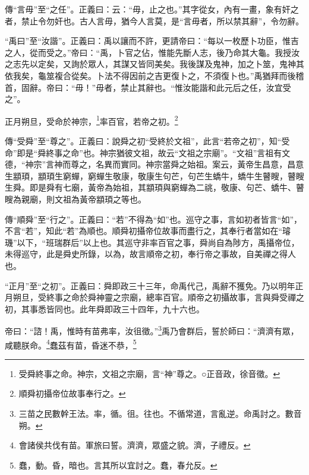 {\noindent\zhuan{}\fzbyks 傳“言毋”至“之任”。正義曰：云：“毋，止之也。”其字從女，內有一畫，象有奸之者，禁止令勿奸也。古人言毋，猶今人言莫，是“言毋者，所以禁其辭”，令勿辭。 \par}

{\noindent\shu{}\fzkt “禹曰”至“汝諧”。正義曰：禹以讓而不許，更請帝曰：“每以一枚歷卜功臣，惟吉之人，從而受之。”帝曰：“禹，卜官之佔，惟能先斷人志，後乃命其大龜。我授汝之志先以定矣，又詢於眾人，其謀又皆同美矣。我後謀及鬼神，加之卜筮，鬼神其依我矣，龜筮複合從矣。卜法不得因前之吉更復卜之，不須復卜也。”禹猶拜而後稽首，固辭。帝曰：“毋！”毋者，禁止其辭也。“惟汝能諧和此元后之任，汝宜受之”。 \par}

正月朔旦，受命於神宗，\footnote{受舜終事之命。神宗，文祖之宗廟，言“神”尊之。○正音政，徐音徵。}率百官，若帝之初。\footnote{順舜初攝帝位故事奉行之。}

{\noindent\zhuan{}\fzbyks 傳“受舜”至“尊之”。正義曰：說舜之初“受終於文祖”，此言“若帝之初”，知“受命”即是“舜終事之命”也。神宗猶彼文祖，故云“文祖之宗廟”。“文祖”言祖有文德，“神宗”言神而尊之，名異而實同。神宗當舜之始祖。案云，黃帝生昌意，昌意生顓頊，顓頊生窮蟬，窮蟬生敬康，敬康生句芒，句芒生蟜牛，蟜牛生瞽瞍，瞽瞍生舜。即是舜有七廟，黃帝為始祖，其顓頊與窮蟬為二祧，敬康、句芒、蟜牛、瞽瞍為親廟，則文祖為黃帝顓頊之等也。 \par}

{\noindent\zhuan{}\fzbyks 傳“順舜”至“行之”。正義曰：“若”不得為“如”也。巡守之事，言如初者皆言“如”，不言“若”，知此“若”為順也。順舜初攝帝位故事而盡行之，其奉行者當如在“璿璣”以下，“班瑞群后”以上也。其巡守非率百官之事，舜尚自為陟方，禹攝帝位，未得巡守，此是舜史所錄，以為，故言順帝之初，奉行帝之事故，自美禪之得人也。 \par}

{\noindent\shu{}\fzkt “正月”至“之初”。正義曰：舜即政三十三年，命禹代己，禹辭不獲免。乃以明年正月朔旦，受終事之命於舜神靈之宗廟，總率百官。順帝之初攝故事，言與舜受禪之初，其事悉皆同也。此年舜即政三十四年，九十六也。 \par}

帝曰：“諮！禹，惟時有苗弗率，汝徂徵。”\footnote{三苗之民數幹王法。率，循。徂。往也。不循常道，言亂逆。命禹討之。數音朔。}禹乃會群后，誓於師曰：“濟濟有眾，咸聽朕命。\footnote{會諸侯共伐有苗。軍旅曰誓。濟濟，眾盛之貌。濟，子禮反。}蠢茲有苗，昏迷不恭，\footnote{蠢，動。昏，暗也。言其所以宜討之。蠢，春允反。}

